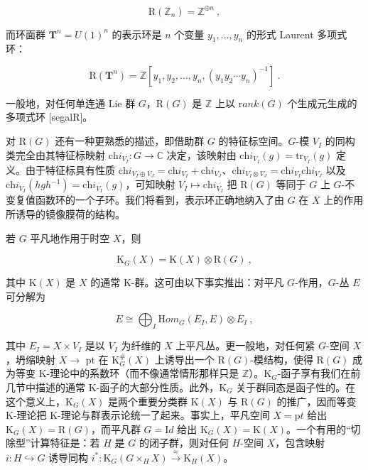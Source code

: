 \documentclass[11pt,a4paper]{ctexart}
\begin{document}
\[{\mathrm R}({\mathbb{Z}}_n)={\mathbb{Z}}^{\oplus n}\ ,\]

而环面群 \({\mathbf T}^n=U(1)^n\) 的表示环是 \(n\) 个变量 \(y_1,\ldots ,y_n\) 的形式 Laurent 多项式环：

\[{\mathrm R}({\mathbf T}^n)={\mathbb{Z}}\left[y_1,y_2,\ldots,y_n,
(y_1y_2\cdots y_n)^{-1}\right]\ .\]

一般地，对任何单连通 Lie 群 \(G\)，\({\mathrm R}(G)\) 是 \({\mathbb{Z}}\) 上以 \({\mathrm rank}(G)\) 个生成元生成的多项式环 [segalR]。

对 \({\mathrm R}(G)\) 还有一种更熟悉的描述，即借助群 \(G\) 的特征标空间。\(G\)-模 \(V_I\) 的同构类完全由其特征标映射 \(\mathrm{ch}i_{V_I}:G\to{\mathbb{C}}\) 决定，该映射由 \(\mathrm{ch}i_{V_I}(g)=\mathrm{tr}_{V_I}(g)\) 定义。由于特征标具有性质 \(\mathrm{ch}i_{V_I\oplus V_J}=\mathrm{ch}i_{V_I}+\mathrm{ch}i_{V_J}\)、\(\mathrm{ch}i_{V_I\otimes V_J}=\mathrm{ch}i_{V_I}\mathrm{ch}i_{V_J}\) 以及 \(\mathrm{ch}i_{V_I}(hgh^{-1})=\mathrm{ch}i_{V_I}(g)\)，可知映射 \(V_I\mapsto\mathrm{ch}i_{V_I}\) 把 \({\mathrm R}(G)\) 等同于 \(G\) 上 \(G\)-不变复值函数环的一个子环。我们将看到，表示环正确地纳入了由 \(G\) 在 \(X\) 上的作用所诱导的镜像膜荷的结构。

若 \(G\) 平凡地作用于时空 \(X\)，则

\[{\mathrm K}_G(X)={\mathrm K}(X)\otimes {\mathrm R}(G)\ ,\]

其中 \({\mathrm K}(X)\) 是 \(X\) 的通常 K-群。这可由以下事实推出：对平凡 \(G\)-作用，\(G\)-丛 \(E\) 可分解为

\[E\cong \bigoplus_{I}{\mathrm Hom}_G(E_I,E)\otimes E_I\ ,\]

其中 \(E_I=X\times V_I\) 是以 \(V_I\) 为纤维的 \(X\) 上平凡丛。更一般地，对任何紧 \(G\)-空间 \(X\)，坍缩映射 \(X\rightarrow\) pt 在 \({\mathrm K}^\#_{G}(X)\) 上诱导出一个 \({\mathrm R}(G)\)-模结构，使得 \({\mathrm R}(G)\) 成为等变 K-理论中的系数环（而不像通常情形那样只是 \({\mathbb{Z}}\)）。\({\mathrm K}_G\)-函子享有我们在前几节中描述的通常 K-函子的大部分性质。此外，\({\mathrm K}_{G}\) 关于群同态是函子性的。在这个意义上，\({\mathrm K}_{G}(X)\) 是两个重要分类群 \({\mathrm K}(X)\) 与 \({\mathrm R}(G)\) 的推广，因而等变 K-理论把 K-理论与群表示论统一了起来。事实上，平凡空间 \(X={\mathrm pt}\) 给出 \({\mathrm K}_G(X)={\mathrm R}(G)\)，而平凡群 \(G={\mathrm Id}\) 给出 \({\mathrm K}_G(X)={\mathrm K}(X)\)。一个有用的``切除型''计算特征是：若 \(H\) 是 \(G\) 的闭子群，则对任何 \(H\)-空间 \(X\)，包含映射 \(i:H\hookrightarrow G\) 诱导同构 \(i^*:{\mathrm K}_{G}(G\times_HX)\stackrel{\approx}{\longrightarrow}{\mathrm K}_H(X)\)。
\end{document}
